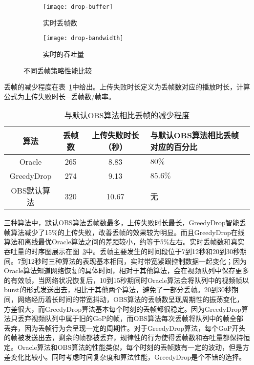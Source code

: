 \begin{figure}[tb]
  \centering%
  \begin{subfigure}{0.49\textwidth}
    \texttt{[image: drop-buffer]}
    \caption{实时丢帧数}
    \label{fig:drop-buffer}
  \end{subfigure}%
  \hfill
  \begin{subfigure}{0.49\textwidth}
    \texttt{[image: drop-bandwidth]}
    \caption{实时的吞吐量}
    \label{fig:drop-bandwidth}
  \end{subfigure}
  \caption{不同丢帧策略性能比较}
  \label{fig:drop_comparison}
\end{figure}

丢帧的减少程度在表~\ref{tab_drop}中给出。上传失败时长定义为丢帧数对应的播放时长，计算公式为上传失败时长=丢帧数/帧率。

\begin{table}[tb]
\centering
\caption{与默认OBS算法相比丢帧的减少程度}
\label{tab_drop}
{\setlength{\tabcolsep}{2pt}
\begin{tabular}{|c|c|c|l|}
\hline
\textbf{算法} &\textbf{丢帧数} &\textbf{上传失败时长（秒）} & \textbf{与默认OBS算法相比丢帧对应的百分比}    \\ \hline
Oracle    &265  &8.83  &$80\%$           \\ \hline
GreedyDrop  &274 &9.13  &$85.6\%$              \\ \hline
OBS默认算法     &320  &10.67  &无 \\ \hline
\end{tabular}}
\end{table}

三种算法中，默认OBS算法丢帧数最多，上传失败时长最长，GreedyDrop智能丢帧算法减少了15\%的上传失败，改善丢帧的效果较为明显。而且GreedyDrop在线算法和离线最优Oracle算法之间的差距较小，约等于5\%左右。实时丢帧数和真实吞吐量的时序图展示在图~\ref{fig:drop_comparison}中。丢帧主要发生的时间段位于7到12秒和20到30秒期间。7到12秒时三种算法的表现基本相同，实时带宽紧跟控制数据一起变化；因为Oracle算法知道网络恢复的具体时间，相对于其他算法，会在视频队列中保存更多的有效帧，当网络状况恢复后，10到15秒期间时Oracle算法会将队列中的视频帧以burst的形式发送出去，相比于其他两个算法，避免了一部分丢帧。20到30秒期间，网络经历着长时间的带宽抖动，OBS算法的丢帧数呈现周期性的振荡变化，方差很大，而GreedyDrop算法基本每个时刻的丢帧都很稳定。因为GreedyDrop算法只丢弃视频队列中属于旧的GoP的帧，而OBS算法每次丢帧将队列中的帧全部丢弃，因为丢帧行为会呈现一定的周期性。对于GreedyDrop算法，每个GoP开头的帧被发送出去，剩余的帧都被丢弃，规律性的行为使得丢帧数和吞吐量都保持恒定。Oracle算法和OBS算法的性能类似，每个时刻的丢帧数有一定的波动，但是方差变化比较小。同时考虑时间复杂度和算法性能，GreedyDrop是个不错的选择。


